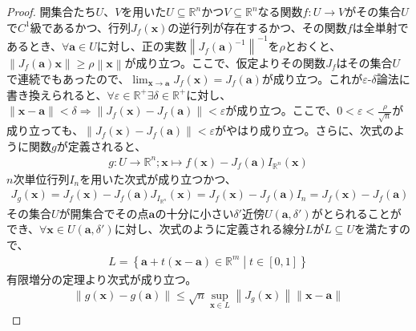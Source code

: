\documentclass[dvipdfmx]{jsarticle}
\begin{document}
\begin{proof}
開集合たち$U$、$V$を用いた$U \subseteq \mathbb{R}^{n}$かつ$V \subseteq \mathbb{R}^{n}$なる関数$f:U \rightarrow V$がその集合$U$で$C^{1}$級であるかつ、行列$J_{f}\left( \mathbf{x} \right)$の逆行列が存在するかつ、その関数$f$は全単射であるとき、$\forall\mathbf{a} \in U$に対し、正の実数$\left\| J_{f}\left( \mathbf{a} \right)^{- 1} \right\|^{- 1}$を$\rho$とおくと、$\left\| J_{f}\left( \mathbf{a} \right)\mathbf{x} \right\| \geq \rho\left\| \mathbf{x} \right\|$が成り立つ。ここで、仮定よりその関数$J_{f}$はその集合$U$で連続でもあったので、$\lim_{\mathbf{x} \rightarrow \mathbf{a}}{J_{f}\left( \mathbf{x} \right)} = J_{f}\left( \mathbf{a} \right)$が成り立つ。これが$\varepsilon $-$\delta $論法に書き換えられると、$\forall\varepsilon \in \mathbb{R}^{+}\exists\delta \in \mathbb{R}^{+}$に対し、$\left\| \mathbf{x} - \mathbf{a} \right\| < \delta \Rightarrow \left\| J_{f}\left( \mathbf{x} \right) - J_{f}\left( \mathbf{a} \right) \right\| < \varepsilon$が成り立つ。ここで、$0 < \varepsilon < \frac{\rho}{\sqrt{n}}$が成り立っても、$\left\| J_{f}\left( \mathbf{x} \right) - J_{f}\left( \mathbf{a} \right) \right\| < \varepsilon$がやはり成り立つ。さらに、次式のように関数$g$が定義されると、
\begin{align*}
g:U \rightarrow \mathbb{R}^{n};\mathbf{x} \mapsto f\left( \mathbf{x} \right) - J_{f}\left( \mathbf{a} \right)I_{\mathbb{R}^{n}}\left( \mathbf{x} \right)
\end{align*}
$n$次単位行列$I_{n}$を用いた次式が成り立つかつ、
\begin{align*}
J_{g}\left( \mathbf{x} \right) = J_{f}\left( \mathbf{x} \right) - J_{f}\left( \mathbf{a} \right)J_{I_{\mathbb{R}^{n}}}\left( \mathbf{x} \right) = J_{f}\left( \mathbf{x} \right) - J_{f}\left( \mathbf{a} \right)I_{n} = J_{f}\left( \mathbf{x} \right) - J_{f}\left( \mathbf{a} \right)
\end{align*}
その集合$U$が開集合でその点$\mathbf{a}$の十分に小さい$\delta'$近傍$U\left( \mathbf{a},\delta' \right)$がとられることができ、$\forall\mathbf{x} \in U\left( \mathbf{a},\delta' \right)$に対し、次式のように定義される線分$L$が$L \subseteq U$を満たすので、
\begin{align*}
L = \left\{ \mathbf{a} + t\left( \mathbf{x} - \mathbf{a} \right) \in \mathbb{R}^{m} \middle| t \in [ 0,1] \right\}
\end{align*}
有限増分の定理より次式が成り立つ。
\begin{align*}
\left\| g\left( \mathbf{x} \right) - g\left( \mathbf{a} \right) \right\| \leq \sqrt{n}\sup_{\mathbf{x} \in L}\left\| J_{g}\left( \mathbf{x} \right) \right\|\left\| \mathbf{x} - \mathbf{a} \right\|

\end{align*}
\end{proof}
\end{document}
